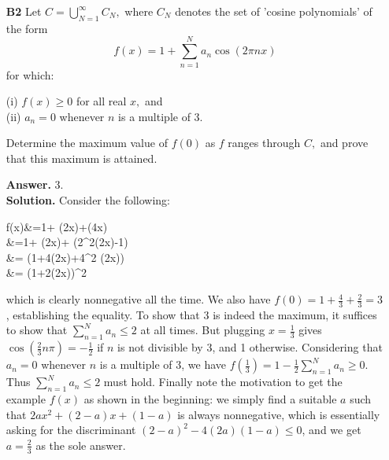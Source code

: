 \documentclass[11pt,a4paper]{article}
\newcommand{\<}{\langle}
\renewcommand{\>}{\rangle}
\begin{document}
\begin{enumerate}
	
	\item[\textbf{B2}] Let $C=\bigcup_{N=1}^{\infty}C_N,$ where $C_N$ denotes the set of 'cosine polynomials' of the form \[f(x)=1+\sum_{n=1}^Na_n\cos(2\pi nx)\] for which:
	
	(i) $f(x)\ge 0$ for all real $x,$ and\\
	(ii) $a_n=0$ whenever $n$ is a multiple of $3.$
	
	Determine the maximum value of  $f(0)$ as $f$ ranges through $C,$ and prove that this maximum is attained.
	
	\textbf{Answer.} 3.\\
	\textbf{Solution. }Consider the following:
	\begin{flalign*}
	f(x)&=1+ \cos(2\pi x)+\cos(4\pi x)\\
	&=1+ \cos(2\pi x)+ (2\cos^2(2\pi x)-1)\\
	&= (1+4\cos(2\pi x)+4\cos^2 (2\pi x))\\
	&= (1+2\cos(2\pi x))^2\\
	\end{flalign*}
	which is clearly nonnegative all the time. We also have $f(0)=1+\frac 43+\frac 23=3$, establishing the equality. To show that 3 is indeed the maximum, it suffices to show that $\sum_{n=1}^N a_n\le 2$ at all times. But plugging $x=\frac 13$ gives $\cos(\frac 23 n\pi)=-\frac 12$ if $n$ is not divisible by 3, and 1 otherwise. Considering that $a_n=0$ whenever $n$ is a multiple of 3, we have $f(\frac 13)=1-\frac 12 \sum_{n=1}^N a_n\ge 0.$ Thus $\sum_{n=1}^N a_n\le 2$ must hold. Finally note the motivation to get the example $f(x)$ as shown in the beginning: we simply find a suitable $a$ such that $2ax^2+(2-a)x+(1-a)$ is always nonnegative, which is essentially asking for the discriminant $(2-a)^2-4(2a)(1-a)\le 0$, and we get $a=\frac 23$ as the sole answer. 
\end{enumerate}
\end{document}
